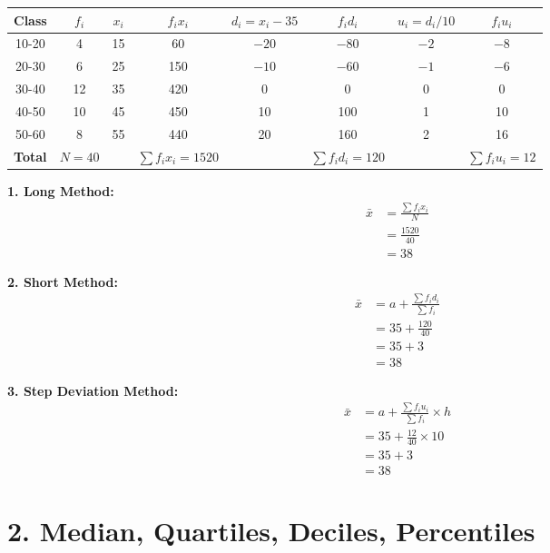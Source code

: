 \documentclass[12pt, a4paper]{article}
\begin{document}
\begin{center}
\renewcommand{\arraystretch}{1.3}
\begin{tabular}{|c|c|c|c|c|c|c|c|}
\hline
\textbf{Class} & $f_i$ & $x_i$ & $f_i x_i$ & $d_i{=}x_i{-}35$ & $f_i d_i$ & $u_i{=}d_i/10$ & $f_i u_i$ \\ \hline
10-20 & 4  & 15 & 60  & $-20$ & $-80$ & $-2$ & $-8$  \\ \hline
20-30 & 6  & 25 & 150 & $-10$ & $-60$ & $-1$ & $-6$  \\ \hline
30-40 & 12 & 35 & 420 &   0   &   0   &   0  &   0   \\ \hline
40-50 & 10 & 45 & 450 &  10   & 100   &   1  &  10   \\ \hline
50-60 & 8  & 55 & 440 &  20   & 160   &   2  &  16   \\ \hline
\textbf{Total} & $N{=}40$ & & $\sum f_i x_i{=}1520$ & & $\sum f_i d_i{=}120$ & & $\sum f_i u_i{=}12$ \\ \hline
\end{tabular}
\end{center}

\textbf{1. Long Method:}
\begin{align*}
\bar{x} &= \frac{\sum f_i x_i}{N} \\
        &= \frac{1520}{40} \\
        &= 38
\end{align*}

\textbf{2. Short Method:}
\begin{align*}
\bar{x} &= a + \frac{\sum f_i d_i}{\sum f_i} \\
        &= 35 + \frac{120}{40} \\
        &= 35 + 3 \\
        &= 38
\end{align*}

\textbf{3. Step Deviation Method:}
\begin{align*}
\bar{x} &= a + \frac{\sum f_i u_i}{\sum f_i} \times h \\
        &= 35 + \frac{12}{40} \times 10 \\
        &= 35 + 3 \\
        &= 38
\end{align*}

\newpage

\section*{2. Median, Quartiles, Deciles, Percentiles}
\end{document}
